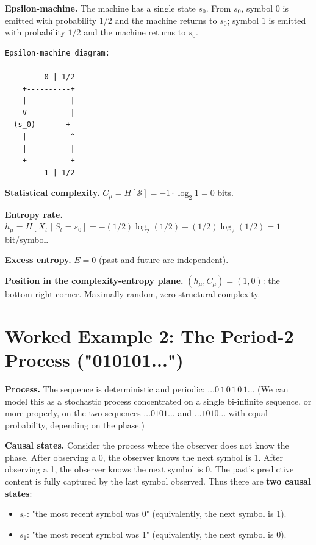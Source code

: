 \textbf{Epsilon-machine.} The machine has a single state $s_0$. From $s_0$, symbol $0$ is emitted with probability $1/2$ and the machine returns to $s_0$; symbol $1$ is emitted with probability $1/2$ and the machine returns to $s_0$.

\begin{verbatim}
Epsilon-machine diagram:

         0 | 1/2
    +----------+
    |          |
    V          |
  (s_0) ------+
    |          ^
    |          |
    +----------+
         1 | 1/2
\end{verbatim}

\textbf{Statistical complexity.} $C_\mu = H[\mathcal{S}] = -1 \cdot \log_2 1 = 0$ bits.

\textbf{Entropy rate.} $h_\mu = H[X_t \mid S_t = s_0] = -(1/2)\log_2(1/2) - (1/2)\log_2(1/2) = 1$ bit/symbol.

\textbf{Excess entropy.} $E = 0$ (past and future are independent).

\textbf{Position in the complexity-entropy plane.} $(h_\mu, C_\mu) = (1, 0)$: the bottom-right corner. Maximally random, zero structural complexity.



\section{Worked Example 2: The Period-2 Process ("010101...")}

\textbf{Process.} The sequence is deterministic and periodic: $\ldots 0\, 1\, 0\, 1\, 0\, 1 \ldots$ (We can model this as a stochastic process concentrated on a single bi-infinite sequence, or more properly, on the two sequences $\ldots 0101\ldots$ and $\ldots 1010\ldots$ with equal probability, depending on the phase.)

\textbf{Causal states.} Consider the process where the observer does not know the phase. After observing a 0, the observer knows the next symbol is 1. After observing a 1, the observer knows the next symbol is 0. The past's predictive content is fully captured by the last symbol observed. Thus there are \textbf{two causal states}:

\begin{itemize}
\item $s_0$: "the most recent symbol was 0" (equivalently, the next symbol is 1).
\item $s_1$: "the most recent symbol was 1" (equivalently, the next symbol is 0).
\end{itemize}

